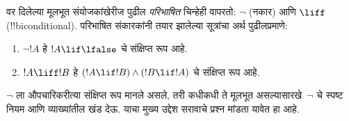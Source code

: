 \documentclass[../../../include/open-logic-section]{subfiles}
\begin{document}
वर दिलेल्या मूलभूत संयोजकांखेरीज पुढील
\emph{परिभाषित} चिन्हेही वापरतो: $\lnot$ (नकार)
आणि $\liff$ (!!{biconditional}). परिभाषित
संकारकांनी तयार झालेल्या सूत्रांचा अर्थ पुढीलप्रमाणे:
\begin{enumerate}
\item $\lnot !A$ हे $!A \lif \lfalse$ चे संक्षिप्त रूप आहे.

\item $!A \liff !B$ हे $(!A \lif !B) \land (!B
  \lif !A)$ चे संक्षिप्त रूप आहे.
\end{enumerate}

$\lnot$ ला औपचारिकरीत्या संक्षिप्त रूप मानले असले,
तरी कधीकधी ते मूलभूत असल्यासारखे~$\lnot$ चे स्पष्ट नियम
आणि व्याख्यांतील खंड देऊ. याचा मुख्य उद्देश सरावाचे
प्रश्न मांडता यावेत हा आहे.
\end{document}
